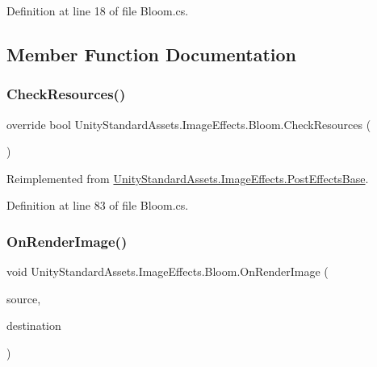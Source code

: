 Definition at line 18 of file Bloom.\+cs.



\subsection{Member Function Documentation}
\mbox{\label{class_unity_standard_assets_1_1_image_effects_1_1_bloom_ac5626c3769fbfaa55d651d22801e0017}} 
\subsubsection{\texorpdfstring{Check\+Resources()}{CheckResources()}}
{\footnotesize\ttfamily override bool Unity\+Standard\+Assets.\+Image\+Effects.\+Bloom.\+Check\+Resources (\begin{DoxyParamCaption}{ }\end{DoxyParamCaption})\hspace{0.3cm}{\ttfamily [virtual]}}



Reimplemented from \mbox{\hyperlink{class_unity_standard_assets_1_1_image_effects_1_1_post_effects_base_a8866612b25b7158b932efd3b832188f8}{Unity\+Standard\+Assets.\+Image\+Effects.\+Post\+Effects\+Base}}.



Definition at line 83 of file Bloom.\+cs.

\mbox{\label{class_unity_standard_assets_1_1_image_effects_1_1_bloom_a92b38d926c4127bc5486214eaf4b0af4}} 
\subsubsection{\texorpdfstring{On\+Render\+Image()}{OnRenderImage()}}
{\footnotesize\ttfamily void Unity\+Standard\+Assets.\+Image\+Effects.\+Bloom.\+On\+Render\+Image (\begin{DoxyParamCaption}\item[{Render\+Texture}]{source,  }\item[{Render\+Texture}]{destination }\end{DoxyParamCaption})}



